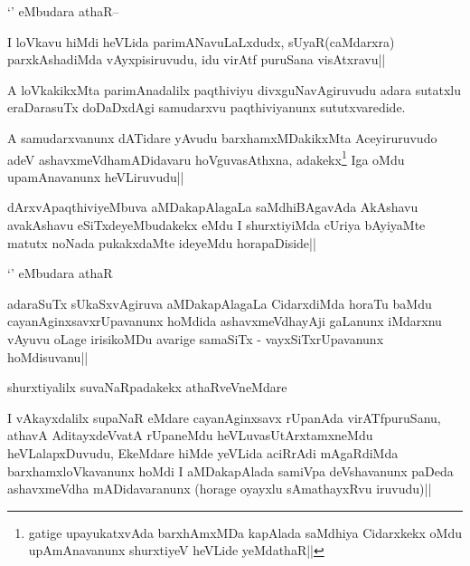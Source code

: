 \begin{artha}
`\stext' eMbudara athaR--
\end{artha}

\begin{artha}
I loVkavu hiMdi heVLida parimANavuLaLxdudx, sUyaR(caMdarxra) parxkAshadiMda vAyxpisiruvudu, idu virAtf puruSana visAtxravu||
\end{artha}

\begin{artha}
A loVkakikxMta parimAnadalilx paqthiviyu divxguNavAgiruvudu adara sutatxlu eraDarasuTx doDaDxdAgi samudarxvu paqthiviyanunx sututxvaredide.
\end{artha}

\begin{artha}
A samudarxvanunx dATidare yAvudu barxhamxMDakikxMta Aceyiruruvudo adeV ashavxmeVdhamADidavaru hoVguvasAthxna, adakekx\footnote{gatige upayukatxvAda barxhAmxMDa  kapAlada saMdhiya Cidarxkekx oMdu upAmAnavanunx shurxtiyeV heVLide yeMdathaR||} Iga oMdu upamAnavanunx heVLiruvudu||
\end{artha}

\begin{artha}
dArxvApaqthiviyeMbuva aMDakapAlagaLa saMdhiBAgavAda AkAshavu avakAshavu eSiTxdeyeMbudakekx \stext eMdu I shurxtiyiMda cUriya bAyiyaMte matutx noNada pukakxdaMte ideyeMdu horapaDiside|| 
\end{artha}

\begin{artha}
`\stext' eMbudara athaR
\end{artha}

\begin{artha}
adaraSuTx sUkaSxvAgiruva aMDakapAlagaLa CidarxdiMda horaTu baMdu cayanAginxsavxrUpavanunx hoMdida ashavxmeVdhayAji gaLanunx iMdarxnu vAyuvu oLage irisikoMDu avarige samaSiTx - vayxSiTxrUpavanunx hoMdisuvanu||
\end{artha}

\begin{artha}
shurxtiyalilx suvaNaRpadakekx athaRveVneMdare
\end{artha}

\begin{artha}
I vAkayxdalilx supaNaR eMdare cayanAginxsavx rUpanAda virATfpuruSanu, athavA AditayxdeVvatA rUpaneMdu heVLuvasUtArxtamxneMdu heVLalapxDuvudu, EkeMdare hiMde yeVLida aciRrAdi mAgaRdiMda barxhamxloVkavanunx hoMdi I aMDakapAlada samiVpa deVshavanunx paDeda ashavxmeVdha mADidavaranunx (horage oyayxlu sAmathayxRvu iruvudu)||
\end{artha}


